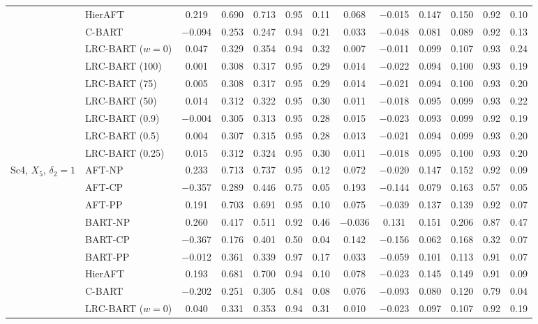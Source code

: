 \documentclass[11pt]{article}
\theoremstyle{definition}
\theoremstyle{plain}
\begin{document}
\begin{center}
\begin{longtable}{llccccccccccc}
& HierAFT & 0.219 & 0.690 & 0.713 & 0.95 & 0.11 & 0.068 & $-$0.015 & 0.147 & 0.150 & 0.92 & 0.10 \\
& C-BART & $-$0.094 & 0.253 & 0.247 & 0.94 & 0.21 & 0.033 & $-$0.048 & 0.081 & 0.089 & 0.92 & 0.13 \\
& LRC-BART ($w=0$) & 0.047 & 0.329 & 0.354 & 0.94 & 0.32 & 0.007 & $-$0.011 & 0.099 & 0.107 & 0.93 & 0.24 \\
& LRC-BART (100) & 0.001 & 0.308 & 0.317 & 0.95 & 0.29 & 0.014 & $-$0.022 & 0.094 & 0.100 & 0.93 & 0.19 \\
& LRC-BART (75) & 0.005 & 0.308 & 0.317 & 0.95 & 0.29 & 0.014 & $-$0.021 & 0.094 & 0.100 & 0.93 & 0.20 \\
& LRC-BART (50) & 0.014 & 0.312 & 0.322 & 0.95 & 0.30 & 0.011 & $-$0.018 & 0.095 & 0.099 & 0.93 & 0.22 \\
& LRC-BART (0.9) & $-$0.004 & 0.305 & 0.313 & 0.95 & 0.28 & 0.015 & $-$0.023 & 0.093 & 0.099 & 0.92 & 0.19 \\
& LRC-BART (0.5) & 0.004 & 0.307 & 0.315 & 0.95 & 0.28 & 0.013 & $-$0.021 & 0.094 & 0.099 & 0.93 & 0.20 \\
& LRC-BART (0.25) & 0.015 & 0.312 & 0.324 & 0.95 & 0.30 & 0.011 & $-$0.018 & 0.095 & 0.100 & 0.93 & 0.20 \\
\midrule
\multirow{15}{*}{Sc4, $X_5$, $\delta_2=1$} & AFT-NP & 0.233 & 0.713 & 0.737 & 0.95 & 0.12 & 0.072 & $-$0.020 & 0.147 & 0.152 & 0.92 & 0.09 \\
& AFT-CP & $-$0.357 & 0.289 & 0.446 & 0.75 & 0.05 & 0.193 & $-$0.144 & 0.079 & 0.163 & 0.57 & 0.05 \\
& AFT-PP & 0.191 & 0.703 & 0.691 & 0.95 & 0.10 & 0.075 & $-$0.039 & 0.137 & 0.139 & 0.92 & 0.07 \\
& BART-NP & 0.260 & 0.417 & 0.511 & 0.92 & 0.46 & $-$0.036 & 0.131 & 0.151 & 0.206 & 0.87 & 0.47 \\
& BART-CP & $-$0.367 & 0.176 & 0.401 & 0.50 & 0.04 & 0.142 & $-$0.156 & 0.062 & 0.168 & 0.32 & 0.07 \\
& BART-PP & $-$0.012 & 0.361 & 0.339 & 0.97 & 0.17 & 0.033 & $-$0.059 & 0.101 & 0.113 & 0.91 & 0.07 \\
& HierAFT & 0.193 & 0.681 & 0.700 & 0.94 & 0.10 & 0.078 & $-$0.023 & 0.145 & 0.149 & 0.91 & 0.09 \\
& C-BART & $-$0.202 & 0.251 & 0.305 & 0.84 & 0.08 & 0.076 & $-$0.093 & 0.080 & 0.120 & 0.79 & 0.04 \\
& LRC-BART ($w=0$) & 0.040 & 0.331 & 0.353 & 0.94 & 0.31 & 0.010 & $-$0.023 & 0.097 & 0.107 & 0.92 & 0.19 \\

\end{longtable}
\end{center}
\end{document}

